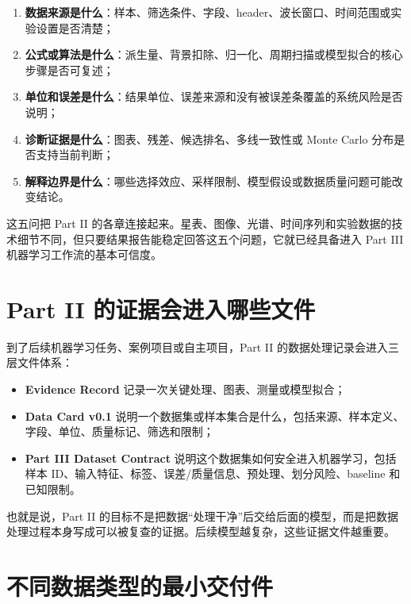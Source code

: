 \begin{enumerate}
    \item \textbf{数据来源是什么}：样本、筛选条件、字段、header、波长窗口、时间范围或实验设置是否清楚；
    \item \textbf{公式或算法是什么}：派生量、背景扣除、归一化、周期扫描或模型拟合的核心步骤是否可复述；
    \item \textbf{单位和误差是什么}：结果单位、误差来源和没有被误差条覆盖的系统风险是否说明；
    \item \textbf{诊断证据是什么}：图表、残差、候选排名、多线一致性或 Monte Carlo 分布是否支持当前判断；
    \item \textbf{解释边界是什么}：哪些选择效应、采样限制、模型假设或数据质量问题可能改变结论。
\end{enumerate}

这五问把 Part II 的各章连接起来。星表、图像、光谱、时间序列和实验数据的技术细节不同，但只要结果报告能稳定回答这五个问题，它就已经具备进入 Part III 机器学习工作流的基本可信度。

\section*{Part II 的证据会进入哪些文件}

到了后续机器学习任务、案例项目或自主项目，Part II 的数据处理记录会进入三层文件体系：

\begin{itemize}
    \item \textbf{Evidence Record} 记录一次关键处理、图表、测量或模型拟合；
    \item \textbf{Data Card v0.1} 说明一个数据集或样本集合是什么，包括来源、样本定义、字段、单位、质量标记、筛选和限制；
    \item \textbf{Part III Dataset Contract} 说明这个数据集如何安全进入机器学习，包括样本 ID、输入特征、标签、误差/质量信息、预处理、划分风险、baseline 和已知限制。
\end{itemize}

也就是说，Part II 的目标不是把数据“处理干净”后交给后面的模型，而是把数据处理过程本身写成可以被复查的证据。后续模型越复杂，这些证据文件越重要。

\section*{不同数据类型的最小交付件}

